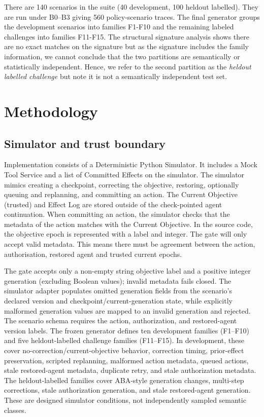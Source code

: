 \documentclass[conference]{IEEEtran}
\begin{document}
There are 140 scenarios in the suite (40 development, 100 heldout labelled). They are run under B0--B3 giving 560 policy-scenario traces. The final generator groups the development scenarios into families F1-F10 and the remaining labeled challenges into families F11-F15. The structural signature analysis shows there are no exact matches on the signature but as the signature includes the family information, we cannot conclude that the two partitions are semantically or statistically independent. Hence, we refer to the second partition as the \emph{heldout labelled challenge} but note it is not a semantically independent test set.

\section{Methodology}
\subsection{Simulator and trust boundary}
Implementation consists of a Deterministic Python Simulator. It includes a Mock Tool Service and a list of Committed Effects on the simulator. The simulator mimics creating a checkpoint, correcting the objective, restoring, optionally queuing and replanning, and committing an action. The Current Objective (trusted) and Effect Log are stored outside of the check-pointed agent continuation. When committing an action, the simulator checks that the metadata of the action matches with the Current Objective. In the source code, the objective epoch is represented with a label and integer. The gate will only accept valid metadata. This means there must be agreement between the action, authorisation, restored agent and trusted current epochs.

The gate accepts only a non-empty string objective label and a positive integer generation (excluding Boolean values); invalid metadata fails closed. The simulator adapter populates omitted generation fields from the scenario's declared version and checkpoint/current-generation state, while explicitly malformed generation values are mapped to an invalid generation and rejected. The scenario schema requires the action, authorization, and restored-agent version labels. The frozen generator defines ten development families (F1--F10) and five heldout-labelled challenge families (F11--F15). In development, these cover no-correction/current-objective behavior, correction timing, prior-effect preservation, scripted replanning, malformed action metadata, queued actions, stale restored-agent metadata, duplicate retry, and stale authorization metadata. The heldout-labelled families cover ABA-style generation changes, multi-step corrections, stale authorization generation, and stale restored-agent generation. These are designed simulator conditions, not independently sampled semantic classes.
\end{document}
